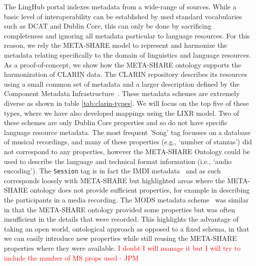 \documentclass{llncs}
\begin{document}
{The LingHub portal indexes metadata from a wide-range of sources. While a basic level of interoperability can be established by used standard vocabularies such as DCAT and Dublin Core, this can only be done by sacrificing completeness and ignoring all metadata particular to language resources. For this reason, we rely the META-SHARE model to represent and harmonize the metadata relating specifically to the domain of linguistics and language resources. As a proof-of-concept, we show how the META-SHARE ontology supports the harmonization of CLARIN data. The
CLARIN repository describes its resources using a small common set of metadata
and a larger description defined by the Component Metadata
Infrastructure~\cite[CMDI]{broeder2012cmdi}. These metadata schemes are
extremely diverse as shown in table \ref{tab:clarin-types}.
We will focus on the
top five of these types, where we have also developed mappings using the LIXR
model. Two of these schemes are only Dublin Core properties and so do not have
specific language resource metadata. The most frequent 'Song' tag focusses on
a database of musical recordings, and many of these properties (e.g., `number of
stanzas') did not correspond to any properties, however the META-SHARE Ontology
could be used to describe the language and technical format information (i.e., `audio
encoding'). The {\tt Session} tag is in fact the IMDI metadata~\cite{broeder2001imdi}
and as such corresponds loosely with META-SHARE but highlighted areas where the
META-SHARE ontology does not provide sufficient properties, for example in
describing the participants in a media recording. The MODS metadata scheme~\cite{todo} was
similar in that the META-SHARE ontology provided some properties but was often
insufficient in the details that were recorded. This highlights the advantage of
taking an open world, ontological approach as opposed to a fixed schema, in that
we can easily introduce new properties while still reusing the META-SHARE properties
where they were available. \textcolor{red}{I doubt I will manage it but I will try
to include the number of MS props used - JPM}

}
\end{document}
